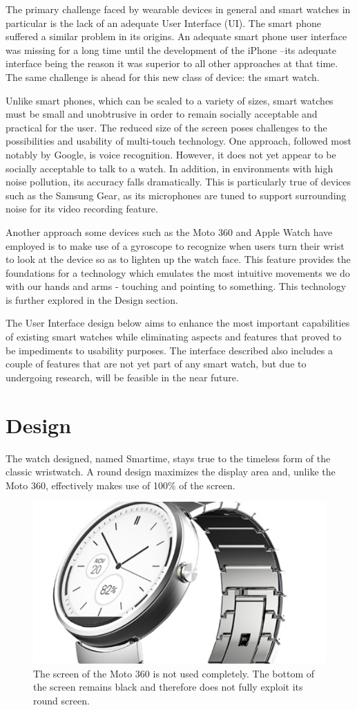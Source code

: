 \documentclass{article}
\begin{document}
The primary challenge faced by wearable devices in general and smart watches in particular is the lack of an adequate User Interface (UI). The smart phone suffered a similar problem in its origins. An adequate smart phone user interface was missing for a long time until the development of the iPhone --its adequate interface being the reason it was superior to all other approaches at that time. The same challenge is ahead for this new class of device: the smart watch. 

Unlike smart phones, which can be scaled to a variety of sizes, smart watches must be small and unobtrusive in order to remain socially acceptable and practical for the user. The reduced size of the screen poses challenges to the possibilities and usability of multi-touch technology. One approach, followed most notably by Google, is voice recognition.  However, it does not yet appear to be socially acceptable to talk to a watch. In addition, in environments with high noise pollution, its accuracy falls dramatically. This is particularly true of devices such as the Samsung Gear, as its microphones are tuned to support surrounding noise for its video recording feature.

Another approach some devices such as the Moto 360 and Apple Watch have employed is to make use of a gyroscope to recognize when users turn their wrist to look at the device so as to lighten up the watch face. This feature provides the foundations for a technology which emulates the most intuitive movements we do with our hands and arms - touching and pointing to something. This technology is further explored in the Design section.

The User Interface design below aims to enhance the most important capabilities of existing smart watches while eliminating aspects and features that proved to be impediments to usability purposes. The interface described also includes a couple of features that are not yet part of any smart watch, but due to undergoing research, will be feasible in the near future. 


\section{Design}
The watch designed, named Smartime, stays true to the timeless form of the classic wristwatch. A round design maximizes the display area and, unlike the Moto 360, effectively makes use of 100\% of the screen.

\begin{figure}[h]
\centering
\includegraphics[width=3 in]{moto360_screen.jpg}
\caption{The screen of the Moto 360 is not used completely. The bottom of the screen remains black and therefore does not fully exploit its round screen. }
\end{figure}
\end{document}
